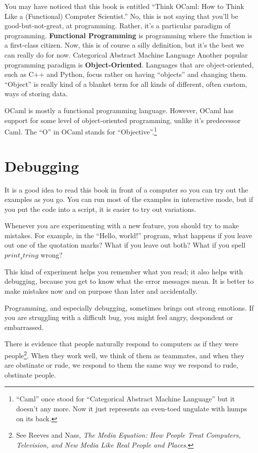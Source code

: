\documentclass[10pt]{book}
\begin{document}
You may have noticed that this book is entitled ``Think OCaml: How to Think Like a (Functional) Computer Scientist.'' 
No, this is not saying that you'll be good-but-not-great, at programming. Rather, it's a particular paradigm of 
programming. {\bf Functional Programming} is programming where the function is a first-class citizen. Now, this is of 
course a silly definition, but it's the best we can really do for now.
Categorical Abstract Machine Language
Another popular programming paradigm is {\bf Object-Oriented}. Languages that are object-oriented, such as C++ and Python, 
focus rather on having ``objects'' and changing them. ``Object'' is really kind of a blanket term for all kinds of 
different, often custom, ways of storing data.

OCaml is mostly a functional programming language. However, OCaml has support for some level of object-oriented programming,
 unlike it's predecessor Caml. The ``O'' in OCaml stands for ``Objective''.\footnote{``Caml'' once stood for ``Categorical 
Abstract Machine Language'' but it doesn't any more. Now it just represents an even-toed ungulate with humps on its back.}

\section{Debugging}

It is a good idea to read this book in front of a computer so you can try out the examples as you go.  You can run most 
of the examples in interactive mode, but if you put the code into a script, it is easier to try out variations.

Whenever you are experimenting with a new feature, you should try to make mistakes.  For example, in the ``Hello, world!'' 
program, what happens if you leave out one of the quotation marks?  What if you leave out both?  What if you spell {\tt 
$print_string$} wrong?


This kind of experiment helps you remember what you read; it also helps with debugging, because you get to know what the 
error messages mean. It is better to make mistakes now and on purpose than later and accidentally.

Programming, and especially debugging, sometimes brings out strong emotions.  If you are struggling with a difficult bug, 
you might feel angry, despondent or embarrassed.

There is evidence that people naturally respond to computers as if they were people\footnote{See Reeves and Nass, {\it The 
Media Equation: How People Treat Computers, Television, and New Media Like Real People and Places}.}.  When they work well, 
we think of them as teammates, and when they are obstinate or rude, we respond to them the same way we respond to rude, 
obstinate people.
\end{document}
